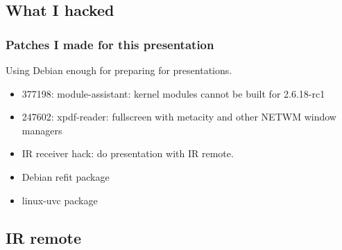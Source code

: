 \documentclass[cjk,dvipdfm]{beamer}
\begin{document}
\subsection{What I hacked}

\begin{frame}
 \frametitle{Patches I made for this presentation}

Using Debian enough for preparing for presentations.

 \begin{itemize}[<+->]
  \item 377198: module-assistant: kernel modules cannot be built for 2.6.18-rc1
  \item 247602: xpdf-reader: fullscreen with metacity and other NETWM
	window managers
  \item IR receiver hack: do presentation with IR remote.
  \item Debian refit package
  \item linux-uvc package
 \end{itemize}
\end{frame}

\subsection{IR remote}
\end{document}
